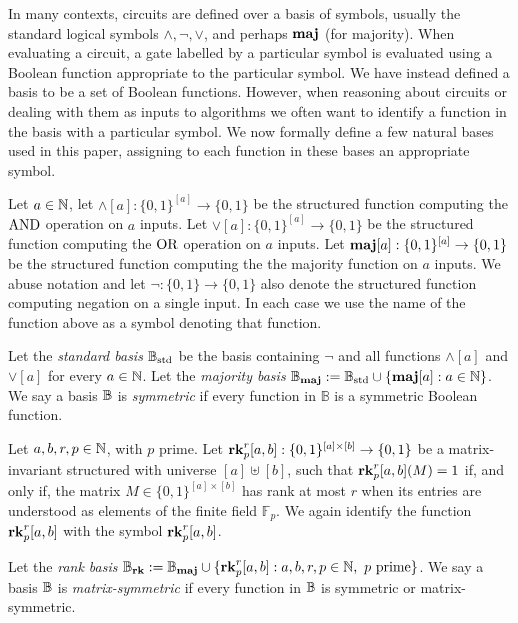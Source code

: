 \documentclass[../paper.tex]{subfiles}
\begin{document}

In many contexts, circuits are defined over a basis of symbols, usually the
standard logical symbols $\land, \neg, \lor$, and perhaps $\text{\textbf{maj}}$ (for majority).
When evaluating a circuit, a gate labelled by a particular symbol is evaluated
using a Boolean function appropriate to the particular symbol. We have instead
defined a basis to be a set of Boolean functions. However, when reasoning about
circuits or dealing with them as inputs to algorithms we often want to identify
a function in the basis with a particular symbol. We now formally define a few
natural bases used in this paper, assigning to each function in these bases an
appropriate symbol.

Let $a \in \mathbb{N}$, let $\land[a] : \{0,1\}^{[a]} \rightarrow \{0,1\}$ be the
structured function computing the $\text{\upshape AND}$ operation on $a$ inputs. Let $\lor[a] :
\{0,1\}^{[a]} \rightarrow \{0,1\}$ be the structured function computing the
$\text{\upshape OR}$ operation on $a$ inputs. Let $\text{\textbf{maj}} [a] : \{0,1\}^{[a]} \rightarrow
\{0,1\}$ be the structured function computing the the majority function on $a$
inputs. We abuse notation and let $\neg : \{0,1\} \rightarrow \{0,1\}$ also
denote the structured function computing negation on a single input. In each
case we use the name of the function above as a symbol denoting that function.

Let the \emph{standard basis} $\mathbb{B}_{\text{std}}$ be the basis containing $\neg$ and all
functions $\land[a]$ and $\lor[a]$ for every $a \in \mathbb{N}$. Let the
\emph{majority basis }$\mathbb{B}_{\text{\textbf{maj}}} := \mathbb{B}_{\text{std}} \cup \{\text{\textbf{maj}}[a] : a \in \mathbb{N}\}$. We say a
basis $\mathbb{B}$ is \emph{symmetric} if every function in $\mathbb{B}$ is a symmetric
Boolean function.

Let $a, b, r, p \in \mathbb{N}$, with $p$ prime. Let $\text{\textbf{rk}}^r_p[a,b] : \{0,1\}^{[a]
  \times [b]} \rightarrow \{0,1\}$ be a matrix-invariant structured with
universe $[a] \uplus [b]$, such that $\text{\textbf{rk}}^r_p[a,b](M) = 1$ if, and only if,
the matrix $M \in \{0,1\}^{[a] \times [b]}$ has rank at most $r$ when its
entries are understood as elements of the finite field $\mathbb{F}_p$. We again
identify the function $\text{\textbf{rk}}^{r}_p[a,b]$ with the symbol $\text{\textbf{rk}}^{r}_p[a,b]$.

Let the \emph{rank basis} $\mathbb{B}_{\text{\textbf{rk}}} := \mathbb{B}_{\text{\textbf{maj}}} \cup \{\text{\textbf{rk}}^{r}_p[a,b] : a, b, r, p \in
\mathbb{N}, \text{ $p$ prime}\}$. We say a basis $\mathbb{B}$ is \emph{matrix-symmetric} if
every function in $\mathbb{B}$ is symmetric or matrix-symmetric.
\end{document}
